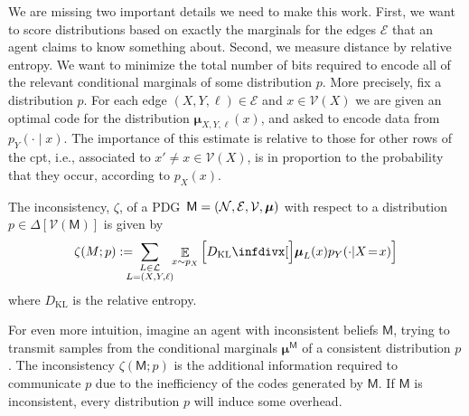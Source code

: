 \documentclass{article}
\def\sheq{\!=\!}
\newcommand{\bmu}{\boldsymbol{\mu}}
\newcommand{\V}{\mathcal V}
\newcommand{\Ed}{\mathcal E}
\newcommand{\sfM}{\mathsf M}
\newcommand{\MN}{PDG}
\numberwithin{equation}{section}
\begin{document}
 	
 	We are missing two important details we need to make this work. 
 	First, we want to score distributions based on exactly the marginals for the edges $\Ed$ that an agent claims to know something about. 
 	Second, we measure distance by relative entropy.
 	We want to minimize the total number of bits required to encode all of the relevant conditional marginals of some distribution $p$. 
 	More precisely, fix a distribution $p$. For each edge $(X, Y, \ell) \in \Ed$ and $x \in \V(X)$ we are given an optimal code for the distribution $\bmu_{X,Y,\ell}(x)$, and asked to encode data from $p_Y( \cdot \mid x)$. The importance of this estimate is relative to those for other rows of the cpt, i.e., associated to $x' \neq x \in \V(X)$, is in proportion to the probability that they occur, according to $p_X(x)$.
 		
	\begin{defn}\label{def:zeta-score}
		The inconsistency, $\zeta$, of a \MN\ $\sfM = \mnvars[]$ with respect to a distribution $p \in \Delta[\V(\sfM)]$ is given by
		\[
			\zeta(M ; p) := %
			\!\!\!\!\!\sum_{\substack{L \in \cal L\\L = (X,Y, \ell)}}\!\! \mathop{\mathbb E}_{x \sim p_X} \left[\kldiv[\Big]{\bmu_{L}(x) }{ p_Y(\cdot | X \sheq x) } \right]
		\]
		where $D_{\mathrm{KL}}$ is the relative entropy.
	\end{defn}

	For even more intuition,
	imagine an agent with inconsistent beliefs $\sfM$, trying to transmit samples from the conditional marginals $\bmu^\sfM$ of a consistent distribution $p$. The inconsistency $\zeta(\sfM;p)$ is the additional information required to communicate $p$ due to the inefficiency of the codes generated by $\sfM$. If $\sfM$ is inconsistent, every distribution $p$ will induce some overhead.
	
\end{document}
